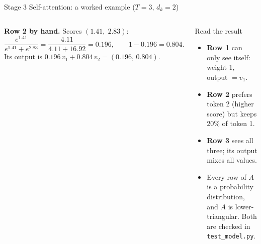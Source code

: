\documentclass[aspectratio=169,10pt]{beamer}
\begin{document}
\begin{frame}{Stage 3 \textbullet{} Self-attention: a worked example ($T=3$, $d_k=2$)}
\begin{columns}[T,onlytextwidth]
{\[\]}
\textbf{Row 2 by hand.} Scores $(1.41,\;2.83)$:
\[
  \frac{e^{1.41}}{e^{1.41}+e^{2.83}}=\frac{4.11}{4.11+16.92}=0.196,\qquad 1-0.196=0.804 .
\]
Its output is $0.196\,v_1+0.804\,v_2=(0.196,\,0.804)$.
\begin{block}{Read the result}
\footnotesize
\begin{itemize}
  \item \textbf{Row 1} can only see itself: weight 1, output $=v_1$.
  \item \textbf{Row 2} prefers token 2 (higher score) but keeps 20\% of token 1.
  \item \textbf{Row 3} sees all three; its output mixes all values.
  \item Every row of $A$ is a probability distribution, and $A$ is lower-triangular.
        Both are checked in \texttt{test\_model.py}.
\end{itemize}
\end{block}
\end{columns}
\end{frame}
\end{document}
